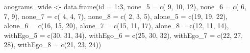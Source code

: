 \documentclass[
]{article}
\newenvironment{Shaded}{\begin{snugshade}}{\end{snugshade}}
\newcommand{\AttributeTok}[1]{\textcolor[rgb]{0.77,0.63,0.00}{#1}}
\newcommand{\DecValTok}[1]{\textcolor[rgb]{0.00,0.00,0.81}{#1}}
\newcommand{\FunctionTok}[1]{\textcolor[rgb]{0.00,0.00,0.00}{#1}}
\newcommand{\NormalTok}[1]{#1}
\newcommand{\OtherTok}[1]{\textcolor[rgb]{0.56,0.35,0.01}{#1}}
\newcommand{\SpecialCharTok}[1]{\textcolor[rgb]{0.00,0.00,0.00}{#1}}
\begin{document}
\begin{Shaded}
\begin{Highlighting}[]
\NormalTok{anograms\_wide }\OtherTok{\textless{}{-}} \FunctionTok{data.frame}\NormalTok{(}\AttributeTok{id =} \DecValTok{1}\SpecialCharTok{:}\DecValTok{3}\NormalTok{,}
                            \AttributeTok{none\_5    =} \FunctionTok{c}\NormalTok{( }\DecValTok{9}\NormalTok{, }\DecValTok{10}\NormalTok{, }\DecValTok{12}\NormalTok{),}
                            \AttributeTok{none\_6    =} \FunctionTok{c}\NormalTok{( }\DecValTok{6}\NormalTok{,  }\DecValTok{7}\NormalTok{,  }\DecValTok{9}\NormalTok{),}
                            \AttributeTok{none\_7    =} \FunctionTok{c}\NormalTok{( }\DecValTok{4}\NormalTok{,  }\DecValTok{4}\NormalTok{,  }\DecValTok{7}\NormalTok{),}
                            \AttributeTok{none\_8    =} \FunctionTok{c}\NormalTok{( }\DecValTok{2}\NormalTok{,  }\DecValTok{3}\NormalTok{,  }\DecValTok{5}\NormalTok{),}
                            \AttributeTok{alone\_5   =} \FunctionTok{c}\NormalTok{(}\DecValTok{19}\NormalTok{, }\DecValTok{19}\NormalTok{, }\DecValTok{22}\NormalTok{),}
                            \AttributeTok{alone\_6   =} \FunctionTok{c}\NormalTok{(}\DecValTok{16}\NormalTok{, }\DecValTok{15}\NormalTok{, }\DecValTok{20}\NormalTok{),}
                            \AttributeTok{alone\_7   =} \FunctionTok{c}\NormalTok{(}\DecValTok{15}\NormalTok{, }\DecValTok{11}\NormalTok{, }\DecValTok{17}\NormalTok{),}
                            \AttributeTok{alone\_8   =} \FunctionTok{c}\NormalTok{(}\DecValTok{12}\NormalTok{, }\DecValTok{11}\NormalTok{, }\DecValTok{14}\NormalTok{),}
                            \AttributeTok{withEgo\_5 =} \FunctionTok{c}\NormalTok{(}\DecValTok{30}\NormalTok{, }\DecValTok{31}\NormalTok{, }\DecValTok{34}\NormalTok{),}
                            \AttributeTok{withEgo\_6 =} \FunctionTok{c}\NormalTok{(}\DecValTok{25}\NormalTok{, }\DecValTok{30}\NormalTok{, }\DecValTok{32}\NormalTok{),}
                            \AttributeTok{withEgo\_7 =} \FunctionTok{c}\NormalTok{(}\DecValTok{22}\NormalTok{, }\DecValTok{27}\NormalTok{, }\DecValTok{28}\NormalTok{),}
                            \AttributeTok{withEgo\_8 =} \FunctionTok{c}\NormalTok{(}\DecValTok{21}\NormalTok{, }\DecValTok{23}\NormalTok{, }\DecValTok{24}\NormalTok{))}


\end{Highlighting}
\end{Shaded}
\end{document}

